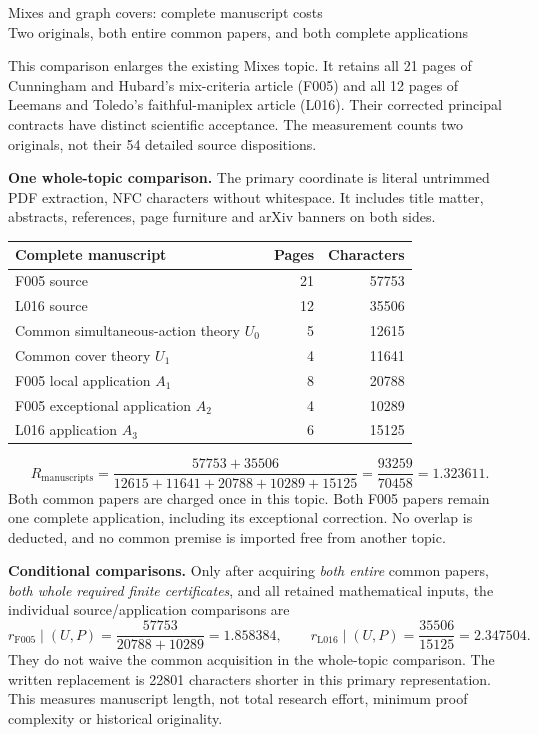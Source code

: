 \documentclass[a4paper,11pt]{article}
\begin{document}
\begin{center}{\Large Mixes and graph covers: complete manuscript costs}\\[3pt]
Two originals, both entire common papers, and both complete applications
\end{center}
This comparison enlarges the existing Mixes topic. It retains all 21 pages of
Cunningham and Hubard's mix-criteria article (F005) and all 12 pages of
Leemans and Toledo's faithful-maniplex article (L016). Their corrected principal
contracts have distinct scientific acceptance. The measurement counts two
originals, not their 54 detailed source dispositions.

\textbf{One whole-topic comparison.} The primary coordinate is literal
untrimmed PDF extraction, NFC characters without whitespace. It includes title
matter, abstracts, references, page furniture and arXiv banners on both sides.
\begin{center}\begin{tabular}{lrr}\toprule
Complete manuscript & Pages & Characters\\\midrule
F005 source &21&57753\\
L016 source &12&35506\\
Common simultaneous-action theory $U_0$ &5&12615\\
Common cover theory $U_1$ &4&11641\\
F005 local application $A_1$ &8&20788\\
F005 exceptional application $A_2$ &4&10289\\
L016 application $A_3$ &6&15125\\\bottomrule
\end{tabular}\end{center}
\[
 R_{\mathrm{manuscripts}}=
 \frac{57753+35506}{12615+11641+20788+10289+15125}
 =\frac{93259}{70458}=1.323611.
\]
Both common papers are charged once in this topic. Both F005 papers remain
one complete application, including its exceptional correction. No overlap
is deducted, and no common premise is imported free from another topic.

\textbf{Conditional comparisons.} Only after acquiring \emph{both entire}
common papers, \emph{both whole required finite certificates}, and all retained
mathematical inputs, the individual source/application comparisons are
\[
 r_{\mathrm{F005}}\mid(U,P)=\frac{57753}{20788+10289}
 =1.858384,\qquad
 r_{\mathrm{L016}}\mid(U,P)=\frac{35506}{15125}
 =2.347504.
\]
They do not waive the common acquisition in the whole-topic comparison.
The written replacement is 22801 characters shorter in this primary
representation. This measures manuscript length, not total research effort,
minimum proof complexity or historical originality.
\end{document}
